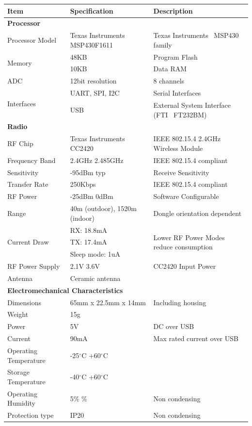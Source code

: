 \begin{table}[H]
	\centering
	\begin{tabular}{| l | l | p{4.5cm} |}
	\hline
	\textbf{Item} & \textbf{Specification} & \textbf{Description} \\
	\hline
	\hline

	\multicolumn{3}{|l|}{\textbf{Processor}} \\
	\hline
	Processor Model & Texas Instruments\textregistered~ MSP430F1611 & Texas Instruments\textregistered~ MSP430 family\\
	\hline
	\multirow{2}{*}{Memory} & 48KB & Program Flash \\
	~ & 10KB & Data RAM \\
	\hline
	ADC & 12bit resolution & 8 channels \\
	\hline
	\multirow{2}{*}{Interfaces} & UART, SPI, I2C & Serial Interfaces \\
	~ & USB & External System Interface (FTI\textregistered~ FT232BM) \\
	\hline
	\hline

	\multicolumn{3}{|l|}{\textbf{Radio}} \\
	\hline
	RF Chip & Texas Instruments\textregistered~ CC2420 & IEEE 802.15.4 2.4GHz Wireless Module\\
	\hline
	 Frequency Band & 2.4GHz \mytilde 2.485GHz & IEEE 802.15.4 compliant \\
	\hline
	Sensitivity & -95dBm typ & Receive Sensitivity \\
	\hline
	Transfer Rate & 250Kbps & IEEE 802.15.4 compliant \\
	\hline
	RF Power & -25dBm \mytilde 0dBm & Software Configurable \\
	\hline
	Range & \mytilde40m (outdoor), 15\mytilde20m (indoor) & Dongle orientation dependent \\
	\hline
	\multirow{3}{*}{Current Draw} & RX: 18.8mA & \multirow{3}{4.5cm}{Lower RF Power Modes reduce consumption} \\
	~ & TX: 17.4mA & ~ \\
	~ & Sleep mode: 1uA & ~ \\
	\hline
	RF Power Supply & 2.1V \mytilde 3.6V & CC2420 Input Power \\
	\hline
	Antenna & Ceramic antenna & ~ \\
	\hline
	\hline

	\multicolumn{3}{|l|}{\textbf{Electromechanical Characteristics}} \\
	\hline
	Dimensions & 65mm x 22.5mm x 14mm & Including housing\\
	\hline
	Weight & 15g & ~\\
	\hline
	Power & 5V  & DC over USB\\
	\hline
	Current & 90mA  & Max rated current over USB\\
	\hline
	Operating Temperature & -25$^\circ$C \mytilde +60$^\circ$C & ~\\
	\hline
	Storage Temperature & -40$^\circ$C \mytilde +60$^\circ$C & ~\\
	\hline
	Operating Humidity & 5\% \mytilde 95\% & Non condensing\\
	\hline
	Protection type & IP20 & Non condensing\\
	\hline


\end{tabular}
\end{table}
